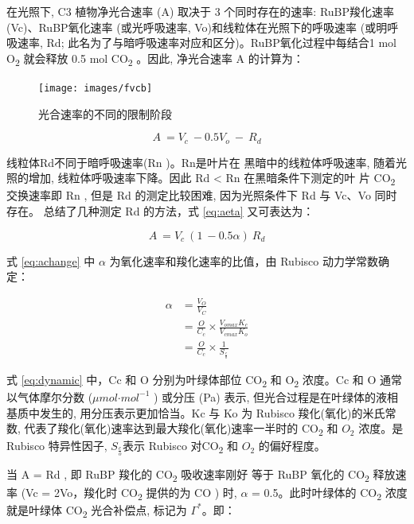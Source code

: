 \documentclass[
]{krantz}
\begin{document}
在光照下, C3 植物净光合速率 (A) 取决于 3 个同时存在的速率: RuBP羧化速率(Vc)、RuBP氧化速率 (或光呼吸速率,
Vo)和线粒体在光照下的呼吸速率 (或明呼吸速率, Rd; 此名为了与暗呼吸速率对应和区分)。RuBP氧化过程中每结合1 mol
O\textsubscript{2} 就会释放 0.5 mol CO\textsubscript{2} 。因此, 净光合速率 A 的计算为：

\begin{figure}
\texttt{[image: images/fvcb]} \caption{光合速率的不同的限制阶段}\label{fig:fvcb}
\end{figure}

\begin{equation}
A\ =V_{c}\ -0.5V_{o}\ -\ R_{d}
\label{eq:aeta}
\end{equation}

线粒体Rd不同于暗呼吸速率(Rn )。Rn是叶片在 黑暗中的线粒体呼吸速率, 随着光照的增加, 线粒体呼吸速率下降。因此 Rd \textless{}
Rn 在黑暗条件下测定的叶 片 CO\textsubscript{2} 交换速率即 Rn , 但是 Rd 的测定比较困难, 因为光照条件下 Rd 与
Vc、Vo 同时存在。\citet{Hikosaka2006Temperature} 总结了几种测定
Rd 的方法，式 \eqref{eq:aeta} 又可表达为：

\begin{equation}
A\ =V_{c}\ (1\ -0.5\alpha)\ R_{d}
\label{eq:achange}
\end{equation}

式 \eqref{eq:achange} 中 \(\alpha\) 为氧化速率和羧化速率的比值，由 Rubisco 动力学常数确定：

\begin{equation}
\begin{split}
\alpha & =\frac{V_{O}}{V_{C}}\\
& = \frac{O}{C_c} \times \frac{V_{omax} K_c}{V_{cmax}K_{o}}\\
& = \frac{O}{C_{c}} \times \frac{1}{S_{\frac{c}{o}}}
\end{split}
\label{eq:dynamic}
\end{equation}

式 \eqref{eq:dynamic} 中，Cc 和 O 分别为叶绿体部位 CO\textsubscript{2} 和 O\textsubscript{2} 浓度。Cc 和
O 通常以气体摩尔分数 (\(\mu mol\text{·}mol^{-1}\) ) 或分压 (Pa) 表示, 但光合过程是在叶绿体的液相基质中发生的,
用分压表示更加恰当。Kc 与 Ko 为 Rubisco 羧化(氧化)的米氏常数, 代表了羧化(氧化)速率达到最大羧化(氧化)速率一半时的
CO\textsubscript{2} 和 \(O_{2}\) 浓度。是 Rubisco 特异性因子, \(S_{\frac{c}{o}}\)表示 Rubisco
对CO\textsubscript{2} 和 \(O_{2}\) 的偏好程度。

当 A = Rd , 即 RuBP 羧化的 CO\textsubscript{2} 吸收速率刚好 等于 RuBP 氧化的 CO\textsubscript{2} 释放速率
(Vc = 2Vo，羧化时 CO\textsubscript{2} 提供的为 CO ) 时, \(\alpha\) = 0.5。此时叶绿体的 CO\textsubscript{2} 浓度就是叶绿体 CO\textsubscript{2}
光合补偿点, 标记为 \(\Gamma^{*}\)。即：
\end{document}
